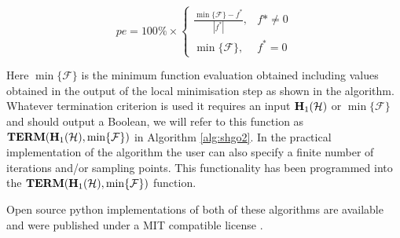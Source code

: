 \[ pe = 100\% \times \begin{cases} 
       \frac{\min\{\mathcal{F}\} - f^*}{|f^*|}, & f* \neq 0 \\
       \min\{\mathcal{F}\},  & f^* = 0
   \end{cases}
\]

Here $\min\{\mathcal{F}\}$ is the minimum function evaluation obtained including values obtained in the output of the local minimisation step as shown in the algorithm. Whatever termination criterion is used it requires an input $\bold{H}_1 (\mathcal{H})$ or $\min\{\mathcal{F}\}$ and should output a Boolean, we will refer to this function as $\mathbf{TERM}(\bold{H}_1 (\mathcal{H}), \min\{\mathcal{F}\})$ in Algorithm \ref{alg:shgo2}. In the practical implementation of the algorithm the user can also specify a finite number of iterations and/or sampling points. This functionality has been programmed into the $\mathbf{TERM}(\bold{H}_1 (\mathcal{H}), \min\{\mathcal{F}\})$ function.


Open source python implementations of both of these algorithms are available and were published under a MIT compatible license \cite{SHGOpy}.

